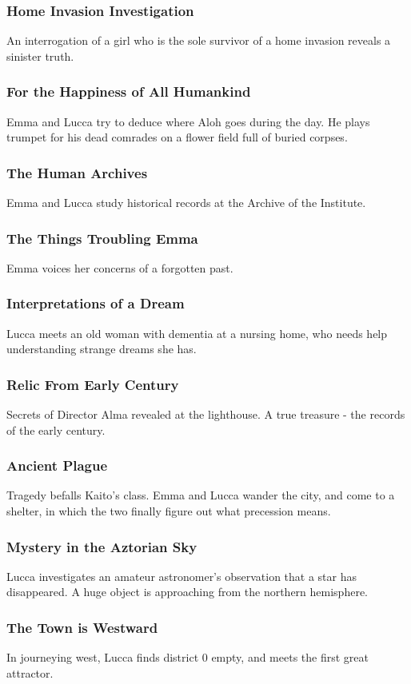 \documentclass[11pt]{article}
\begin{document}
		\subsubsection{Home Invasion Investigation}
		An interrogation of a girl who is the sole survivor of a home invasion reveals a sinister truth.
		\subsubsection{For the Happiness of All Humankind}
		Emma and Lucca try to deduce where Aloh goes during the day.
		He plays trumpet for his dead comrades on a flower field full of buried corpses.
		\subsubsection{The Human Archives}
		Emma and Lucca study historical records at the Archive of the Institute.
		\subsubsection{The Things Troubling Emma}
		Emma voices her concerns of a forgotten past.
		\subsubsection{Interpretations of a Dream}
		Lucca meets an old woman with dementia at a nursing home, who needs help understanding strange dreams she has. 
		\subsubsection{Relic From Early Century}
		Secrets of Director Alma revealed at the lighthouse.
		A true treasure - the records of the early century.
		\subsubsection{Ancient Plague}
		Tragedy befalls Kaito's class.
		Emma and Lucca wander the city, and come to a shelter, in which the two finally figure out what precession means.
		\subsubsection{Mystery in the Aztorian Sky}
		Lucca investigates an amateur astronomer's observation that a star has disappeared.
		A huge object is approaching from the northern hemisphere.
		\subsubsection{The Town is Westward}
		In journeying west, Lucca finds district 0 empty, and meets the first great attractor.
\end{document}
